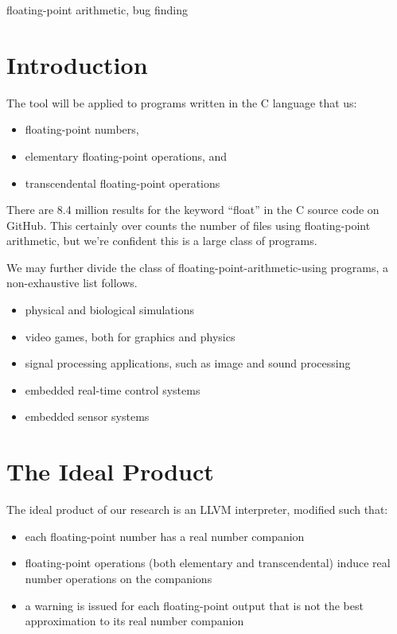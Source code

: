 \documentclass[preprint, authoryear]{sigplanconf}
\begin{document}
\keywords
floating-point arithmetic, bug finding

\section{Introduction}

The tool will be applied to programs written in the C language that us:
\begin{itemize}
\item floating-point numbers,
\item elementary floating-point operations, and
\item transcendental floating-point operations
\end{itemize}

There are 8.4 million results for the keyword ``float'' in the C source code on
GitHub. This certainly over counts the number of files using floating-point
arithmetic, but we're confident this is a large class of programs.

We may further divide the class of floating-point-arithmetic-using programs, a
non-exhaustive list follows.
\begin{itemize}
\item physical and biological simulations
\item video games, both for graphics and physics
\item signal processing applications, such as image and sound processing
\item embedded real-time control systems
\item embedded sensor systems
\end{itemize}

\section{The Ideal Product}

The ideal product of our research is an LLVM interpreter, modified such that:

\begin{itemize}
\item each floating-point number has a real number companion
\item floating-point operations (both elementary and transcendental) induce real
  number operations on the companions
\item a warning is issued for each floating-point output that is not the best
  approximation to its real number companion
\end{itemize}
\end{document}
